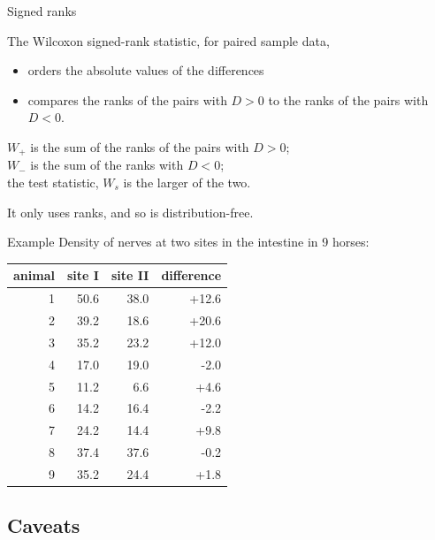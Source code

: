 \begin{frame}{Signed ranks}

    The Wilcoxon signed-rank statistic, for paired sample data,
    \begin{itemize}
        \item orders the \alert{absolute values} of the differences
        \item compares the ranks of the pairs with $D>0$ to the ranks of the pairs with $D<0$.
    \end{itemize}

    \vspace{2em}

    $W_+$ is the sum of the ranks of the pairs with $D>0$; \\
    $W_-$ is the sum of the ranks with $D<0$; \\
    the \alert{test statistic}, $W_s$ is the larger of the two.

    \vspace{2em}

    It only uses \alert{ranks},
    and so is distribution-free.

\end{frame}

\begin{frame}{Example}
    Density of nerves at two sites in the intestine in 9 horses:
    \begin{center}
\begin{tabular}{rrrr}
  \hline
 animal & site I & site II & difference \\ 
  \hline
  1 &  50.6 & 38.0 & +12.6 \\ 
  2 &  39.2 & 18.6 & +20.6 \\ 
  3 &  35.2 & 23.2 & +12.0 \\ 
  4 &  17.0 & 19.0 & -2.0 \\ 
  5 &  11.2 & 6.6 & +4.6 \\ 
  6 &  14.2 & 16.4 & -2.2 \\ 
  7 &  24.2 & 14.4 & +9.8 \\ 
  8 &  37.4 & 37.6 & -0.2 \\ 
  9 &  35.2 & 24.4 & +1.8 \\ 
   \hline
\end{tabular}
    \end{center}

\end{frame}

\subsection{Caveats}


